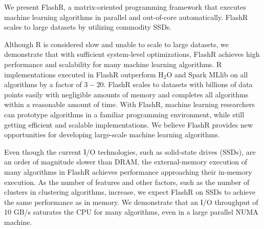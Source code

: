 We present FlashR, a matrix-oriented programming framework that executes
machine learning algorithms in parallel and out-of-core
automatically. FlashR scales to large datasets by utilizing commodity SSDs.

Although R is considered slow and unable to scale to large datasets,
we demonstrate that with sufficient system-level optimizations, FlashR
achieves high performance and scalability
for many machine learning algorithms. R implementations executed in FlashR
outperform H$_2$O and Spark MLlib on all algorithms by a factor of $3-20$.
FlashR scales to datasets with billions of
data points easily with negligible amounts of memory and completes all
algorithms within a reasonable amount of time. With FlashR, machine learning
researchers can prototype algorithms in a familiar programming environment,
while still getting efficient and scalable implementations.
We believe FlashR provides new opportunities for developing large-scale
machine learning algorithms.

Even though the current I/O technologies, such as solid-state drives (SSDs),
are an order of magnitude slower than DRAM, the external-memory execution
of many algorithms in FlashR achieves performance approaching their in-memory
execution. As the number of features and other factors, such as the number of
clusters in clustering algorithms, increase, we expect FlashR on SSDs to achieve
the same performance as
in memory. We demonstrate that an I/O throughput of 10 GB/s saturates the CPU
for many algorithms, even in a large parallel NUMA machine. 
